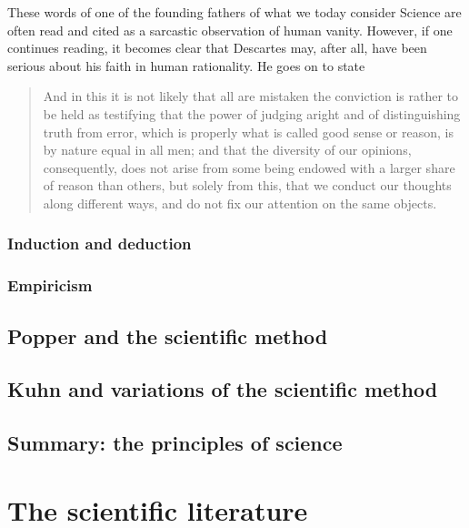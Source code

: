 \documentclass{tufte-book}
\begin{document}
These words of one of the founding fathers of what we today consider Science are often read and cited as a sarcastic observation of human vanity. However, if one continues reading, it becomes clear that Descartes may, after all, have been serious about his faith in human rationality. He goes on to state

\begin{quote}
And in this it is not likely that all are mistaken the conviction is rather to be held as testifying that the power of judging aright and of distinguishing truth from error, which is properly what is called good sense or reason, is by nature equal in all men; and that the diversity of our opinions, consequently, does not arise from some being endowed with a larger share of reason than others, but solely from this, that we conduct our thoughts along different ways, and do not fix our attention on the same objects. 
\end{quote}



\subsection{Induction and deduction}

\subsection{Empiricism}



\section{Popper and the scientific method}



\section{Kuhn and variations of the scientific method}



\section{Summary: the principles of science}





\chapter{The scientific literature}
\end{document}
